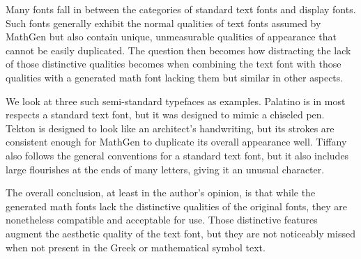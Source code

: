 
Many fonts fall in between the categories of standard text fonts and display
fonts. Such fonts generally exhibit the normal qualities of text fonts assumed
by MathGen but also contain unique, unmeasurable qualities of appearance that
cannot be easily duplicated. The question then becomes how distracting the lack
of those distinctive qualities becomes when combining the text font with those
qualities with a generated math font lacking them but similar in other aspects.

We look at three such semi-standard typefaces as examples. Palatino is in most
respects a standard text font, but it was designed to mimic a chiseled pen.
Tekton is designed to look like an architect's handwriting, but its strokes are
consistent enough for MathGen to duplicate its overall appearance well. Tiffany
also follows the general conventions for a standard text font, but it also
includes large flourishes at the ends of many letters, giving it an unusual
character.

The overall conclusion, at least in the author's opinion, is that while the
generated math fonts lack the distinctive qualities of the original fonts, they
are nonetheless compatible and acceptable for use. Those distinctive features
augment the aesthetic quality of the text font, but they are not noticeably
missed when not present in the Greek or mathematical symbol text.
